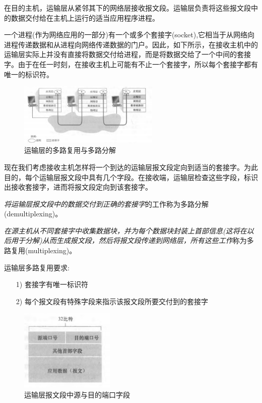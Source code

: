     在目的主机，运输层从紧邻其下的网络层接收报文段。运输层负责将这些报文段中的数据交付给在主机上运行的适当应用程序进程。

    一个进程(作为网络应用的一部分)有一个或多个套接字(socket),它相当于从网络向进程传递数据和从进程向网络传递数据的门户。因此，如下所示，在接收主机中的运输层实际上并没有直接将数据交付给进程，而是将数据交给了一个中间的套接字。由于在任一时刻，在接收主机上可能有不止一个套接字，所以每个套接字都有唯一的标识符。

\begin{figure}[!htbp]
    \centering
    \includegraphics[width=0.6\textwidth]{image/chapter03/多路复用和多路分解.png}
    \caption{运输层的多路复用与多路分解}
\end{figure}

    现在我们考虑接收主机怎样将一个到达的运输层报文段定向到适当的套接字。为此目的，每个运输层报文段中具有几个字段。在接收端，运输层检查这些字段，标识出接收套接字，进而将报文段定向到该套接字。

    \emph{将运输层报文段中的数据交付到正确的套接字}的工作称为多路分解(demultiplexing)。

    \emph{在源主机从不同套接字中收集数据块，并为每个数据块封装上首部信息(这将在以后用于分解)从而生成报文段，然后将报文段传递到网络层，所有这些工作}称为多路复用(multiplexing)。

    运输层多路复用要求:

\begin{itemize}
    \item [1)] 套接字有唯一标识符
    \item [2)] 每个报文段有特殊字段来指示该报文段所要交付到的套接字
\end{itemize}

\begin{figure}[!htbp]
    \centering
    \includegraphics[width=0.4\textwidth]{image/chapter03/运输层报文段中的源-目的端口号字段.png}
    \caption{运输层报文段中源与目的端口字段}
\end{figure}

